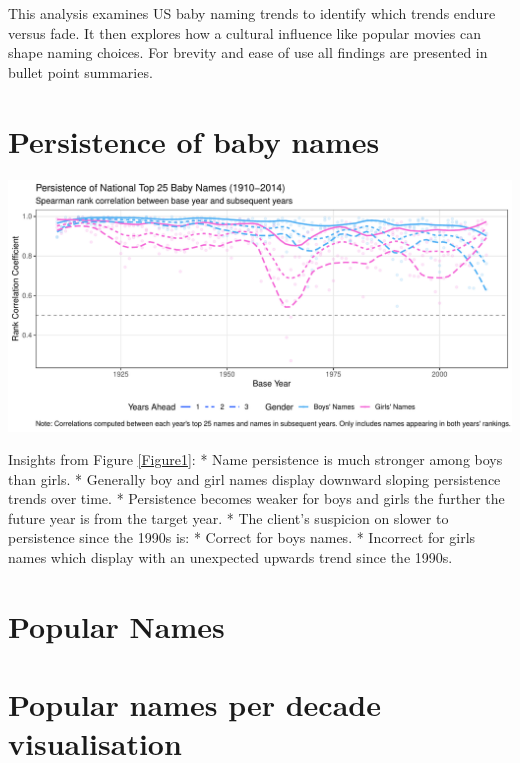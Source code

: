 \documentclass[11pt,preprint]{elsarticle}
\let\origfigure\figure
\let\endorigfigure\endfigure
\renewenvironment{figure}[1][2] {
    \expandafter\origfigure\expandafter[H]
} {
    \endorigfigure
}
\numberwithin{equation}{section}
\numberwithin{figure}{section}
\numberwithin{table}{section}
\begin{document}
This analysis examines US baby naming trends to identify which trends
endure versus fade. It then explores how a cultural influence like
popular movies can shape naming choices. For brevity and ease of use all
findings are presented in bullet point summaries.

\section{Persistence of baby names}\label{persistence-of-baby-names}

\begin{figure}[H]

{\centering \includegraphics{Question1_files/figure-latex/unnamed-chunk-1-1} 

}

\caption{Persistence of National Top 25 Baby Names (1910-2014) by Spearman rank-correlation.\label{Figure1}}\label{fig:unnamed-chunk-1}
\end{figure}

Insights from Figure \ref{Figure1}: * Name persistence is much stronger
among boys than girls. * Generally boy and girl names display downward
sloping persistence trends over time. * Persistence becomes weaker for
boys and girls the further the future year is from the target year. *
The client's suspicion on slower to persistence since the 1990s is: *
Correct for boys names. * Incorrect for girls names which display with
an unexpected upwards trend since the 1990s.

\newpage

\section{Popular Names}\label{popular-names}

\section{Popular names per decade
visualisation}\label{popular-names-per-decade-visualisation}
\end{document}
